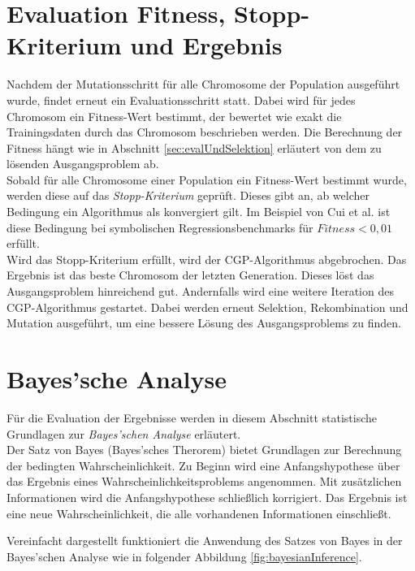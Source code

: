 \section{Evaluation Fitness, Stopp-Kriterium und Ergebnis}
\label{sec:fitness,StopKrit,Ergebnis}

Nachdem der Mutationsschritt für alle Chromosome der Population ausgeführt wurde, findet erneut ein Evaluationsschritt statt.
Dabei wird für jedes Chromosom ein Fitness-Wert bestimmt, der bewertet wie exakt die Trainingsdaten durch das Chromosom beschrieben werden. \cite{milad_taleby_ahvanooey_survey_2019}
Die Berechnung der Fitness hängt wie in Abschnitt \ref{sec:evalUndSelektion} erläutert von dem zu lösenden Ausgangsproblem ab.\\
Sobald für alle Chromosome einer Population ein Fitness-Wert bestimmt wurde, werden diese auf das \emph{Stopp-Kriterium} geprüft.
Dieses gibt an, ab welcher Bedingung ein Algorithmus als konvergiert gilt.
Im Beispiel von Cui et al. ist diese Bedingung bei symbolischen Regressionsbenchmarks für $Fitness < 0,01$ erfüllt. \cite{affenzeller_positional_2024}\\
Wird das Stopp-Kriterium erfüllt, wird der CGP-Algorithmus abgebrochen.
Das Ergebnis ist das beste Chromosom der letzten Generation.
Dieses löst das Ausgangsproblem hinreichend gut.
Andernfalls wird eine weitere Iteration des CGP-Algorithmus gestartet. 
Dabei werden erneut Selektion, Rekombination und Mutation ausgeführt, um eine bessere Lösung des Ausgangsproblems zu finden.

\section{Bayes'sche Analyse}
\label{sec:bayesian}

Für die Evaluation der Ergebnisse werden in diesem Abschnitt statistische Grundlagen zur \emph{Bayes'schen Analyse} erläutert.\\
Der Satz von Bayes (Bayes'sches Therorem) bietet Grundlagen zur Berechnung der bedingten Wahrscheinlichkeit.
Zu Beginn wird eine Anfangshypothese über das Ergebnis eines Wahrscheinlichkeitsproblems angenommen.
Mit zusätzlichen Informationen wird die Anfangshypothese schließlich korrigiert.
Das Ergebnis ist eine neue Wahrscheinlichkeit, die alle vorhandenen Informationen einschließt. \cite{peyrolon_definition_2020}

Vereinfacht dargestellt funktioniert die Anwendung des Satzes von Bayes in der Bayes'schen Analyse wie in folgender Abbildung \ref{fig:bayesianInference}.

